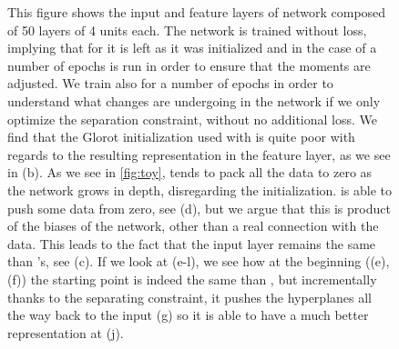 \begin{figure}
  \caption{This figure shows the input and feature layers of network composed of 50 layers of 4 units each. The network is trained without loss, implying that for \ReLU it is left as it was initialized and in the case of \ReLUBN a number of epochs is run in order to ensure that the moments are adjusted. We train also \SepLayer for a number of epochs in order to understand what changes are undergoing in the network if we only optimize the separation constraint, without no additional loss. We find that the Glorot initialization used with \ReLU is quite poor with regards to the resulting representation in the feature layer, as we see in (b). As we see in \ref{fig:toy}, \ReLU tends to pack all the data to zero as the network grows in depth, disregarding the initialization. \ReLUBN is able to push some data from zero, see (d), but we argue that this is product of the biases of the network, other than a real connection with the data. This leads to the fact that the input layer remains the same than \ReLU's, see (c). If we look at \SepLayer (e-l), we see how at the beginning ((e), (f)) the starting point is indeed the same than \ReLU, but incrementally thanks to the separating constraint, it pushes the hyperplanes all the way back to the input (g) so it is able to have a much better representation at (j).} 
  \label{fig:init} 
\end{figure}

